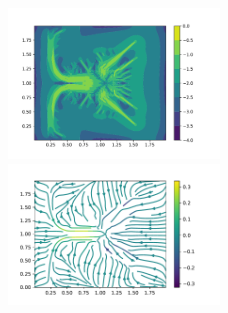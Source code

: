 \documentclass[letterpaper,12pt]{article}
\theoremstyle{plain}
\theoremstyle{remark}
\theoremstyle{remark}
\theoremstyle{remark}
\numberwithin{equation}{section}
\begin{document}
\begin{figure}
  \includegraphics[width=0.5\textwidth]{1/PCG}
  \includegraphics[width=0.5\textwidth]{1/vector}
\end{figure}
\end{document}
